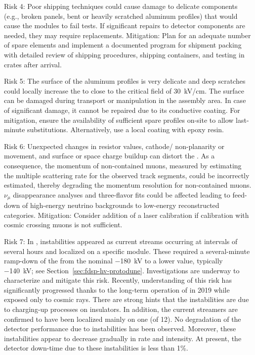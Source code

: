 Risk 4: Poor shipping techniques could cause damage to delicate components (e.g., broken  panels, bent or heavily scratched aluminum profiles) that would cause the modules to fail  tests. 
If significant repairs to detector components are needed, they may require replacements.   Mitigation: Plan for an adequate number of spare elements and implement 
a documented  program for shipment packing with detailed review of shipping procedures, shipping containers, and testing in crates after arrival.

Risk 5: The surface of the aluminum profiles is very delicate and deep scratches could locally increase the \efield to close to the critical field of \SI{30}{\kV}/cm. The surface can be damaged during transport or manipulation in the assembly area. In case of significant damage, it cannot be repaired due to its conductive coating. For mitigation, ensure the availability of sufficient spare profiles %
on-site to allow last-minute substitutions. Alternatively, use a local coating with epoxy resin. %

Risk 6: Unexpected changes in  resistor values, cathode/ non-planarity or movement, and surface or space charge buildup can distort the \efield. As a consequence, the momentum of non-contained muons,  measured by estimating the multiple scattering rate for the observed track segments, could be incorrectly estimated, thereby degrading %
the momentum resolution for non-contained muons.  ${\nu}_{\mu}$ disappearance analyses and three-flavor fits could be affected %
leading to feed-down of high-energy neutrino backgrounds to low-energy reconstructed categories.  Mitigation: Consider addition of a laser calibration %
if calibration with cosmic crossing muons is not sufficient. 

Risk 7:  In ,  instabilities appeared as current streams occurring at intervals of several hours and localized on  a specific  module. These required a several-minute ramp-down of the  from the nominal \SI{-180}{kV} to a lower value, typically \SI{-140}{kV}; see Section~\ref{sec:fdsp-hv-protodune}.
Investigations are underway to characterize and mitigate this risk. Recently, understanding of this risk has significantly progressed thanks to the 
long-term operation of  in 2019 while exposed only to cosmic rays. 
There are strong hints %
that the instabilities are due to charging-up processes on insulators. In addition, %
the current streamers are confirmed to have been localized mainly on %
one  (of 12). No degradation of the detector performance due to  instabilities has been observed. %
Moreover, these instabilities appear to decrease gradually in rate and intensity. At present, the detector down-time due to these instabilities is less than 1\%.  


